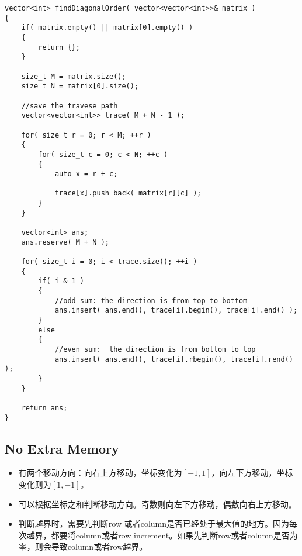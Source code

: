 \setcounter{lstlisting}{0}
\begin{lstlisting}[style=customc, caption={Diagonal Element Has Same Sum Of Row and Column}]
vector<int> findDiagonalOrder( vector<vector<int>>& matrix )
{
    if( matrix.empty() || matrix[0].empty() )
    {
        return {};
    }

    size_t M = matrix.size();
    size_t N = matrix[0].size();

    //save the travese path
    vector<vector<int>> trace( M + N - 1 );

    for( size_t r = 0; r < M; ++r )
    {
        for( size_t c = 0; c < N; ++c )
        {
            auto x = r + c;

            trace[x].push_back( matrix[r][c] );
        }
    }

    vector<int> ans;
    ans.reserve( M + N );

    for( size_t i = 0; i < trace.size(); ++i )
    {
        if( i & 1 )
        {
            //odd sum: the direction is from top to bottom
            ans.insert( ans.end(), trace[i].begin(), trace[i].end() );
        }
        else
        {
            //even sum:  the direction is from bottom to top
            ans.insert( ans.end(), trace[i].rbegin(), trace[i].rend() );
        }
    }

    return ans;
}
\end{lstlisting}

\subsection{No Extra Memory}
\begin{itemize}
\item 有两个移动方向：向右上方移动，坐标变化为$[-1, 1]$，向左下方移动，坐标变化则为$[1, -1]$。
\item 可以根据坐标之和判断移动方向。奇数则向左下方移动，偶数向右上方移动。
\item 判断越界时，需要先判断row 或者column是否已经处于最大值的地方。因为每次越界，都要将column或者row increment。如果先判断row或者column是否为零，则会导致column或者row越界。
\end{itemize}

